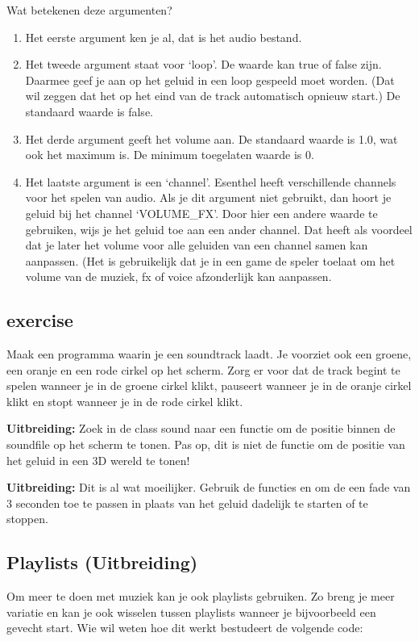 Wat betekenen deze argumenten?

\begin{enumerate}
\item Het eerste argument ken je al, dat is het audio bestand.
\item Het tweede argument staat voor `loop'. De waarde kan true of false zijn. Daarmee geef je aan op het geluid in een loop gespeeld moet worden. (Dat wil zeggen dat het op het eind van de track automatisch opnieuw start.) De standaard waarde is false.
\item Het derde argument geeft het volume aan. De standaard waarde is 1.0, wat ook het maximum is. De minimum toegelaten waarde is 0.
\item Het laatste argument is een `channel'. Esenthel heeft verschillende channels voor het spelen van audio. Als je dit argument niet gebruikt, dan hoort je geluid bij het channel `VOLUME\_FX'. Door hier een andere waarde te gebruiken, wijs je het geluid toe aan een ander channel. Dat heeft als voordeel dat je later het volume voor alle geluiden van een channel samen kan aanpassen. (Het is gebruikelijk dat je in een game de speler toelaat om het volume van de muziek, fx of voice afzonderlijk kan aanpassen.
\end{enumerate}

\subsection{exercise}
Maak een programma waarin je een soundtrack laadt. Je voorziet ook een groene, een oranje en een rode cirkel op het scherm. Zorg er voor dat de track begint te spelen wanneer je in de groene cirkel klikt, pauseert wanneer je in de oranje cirkel klikt en stopt wanneer je in de rode cirkel klikt.

\textbf{Uitbreiding:} Zoek in de class sound naar een functie om de positie binnen de soundfile op het scherm te tonen. Pas op, dit is niet de functie om de positie van het geluid in een 3D wereld te tonen!

\textbf{Uitbreiding:} Dit is al wat moeilijker. Gebruik de functies  en  om de een fade van 3 seconden toe te passen in plaats van het geluid dadelijk te starten of te stoppen.

\subsection{Playlists (Uitbreiding)}
Om meer te doen met muziek kan je ook playlists gebruiken. Zo breng je meer variatie en kan je ook wisselen tussen playlists wanneer je bijvoorbeeld een gevecht start. Wie wil weten hoe dit werkt bestudeert de volgende code:

